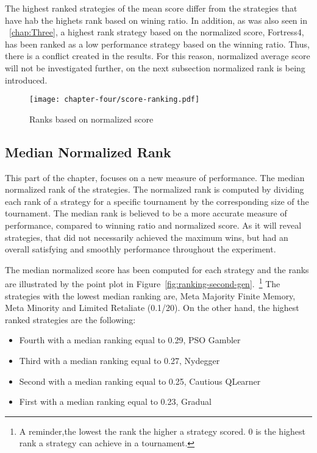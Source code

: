 The highest ranked strategies of the mean score differ from the strategies that
have hab the highets rank based on wining ratio. In addition, as was also seen
in ~\autoref{chap:Three}, a highest rank strategy based on the normalized score,
Fortress4, has been ranked as a low performance strategy based on the winning ratio.
Thus, there is a conflict created in the results. For this reason, normalized
average score will not be investigated further, on the next subsection normalized
rank is being introduced.

\begin{figure}[H]
	\texttt{[image: chapter-four/score-ranking.pdf]}
	\caption{Ranks based on normalized score}
	\label{fig:wining-second-gen}
\end{figure}

\subsection{Median Normalized Rank}

This part of the chapter, focuses on a new measure of performance. The
median normalized rank of the strategies. The normalized rank is computed
by dividing each rank of a strategy for a specific tournament by the corresponding
size of the tournament. The median rank is believed to be a more accurate
measure of performance, compared to winning ratio and normalized score.
As it will reveal strategies, that did not necessarily achieved the maximum wins,
but had an overall satisfying and smoothly performance throughout the experiment.

The median normalized score has been computed for each strategy and the ranks
are illustrated by the point plot in Figure~\ref{fig:ranking-second-gen}.~\footnote{A reminder,the
	lowest the rank the higher a strategy scored. 0 is the highest rank a strategy
can achieve in a tournament.} The strategies with the lowest median ranking are,
Meta Majority Finite Memory, Meta Minority and Limited Retaliate (0.1/20).
On the other hand, the highest ranked strategies are the following:

\begin{itemize}
	\item Fourth with a median ranking equal to 0.29, PSO Gambler
	\item Third with a median ranking equal to 0.27, Nydegger
	\item Second with a median ranking equal to 0.25, Cautious QLearner
	\item First with a median ranking equal to 0.23, Gradual
\end{itemize}

